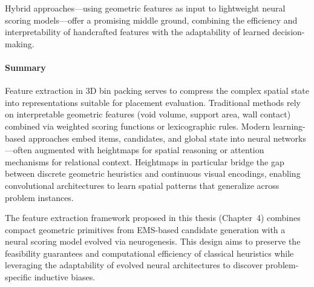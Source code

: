 Hybrid approaches---using geometric features as input to lightweight neural scoring models---offer a promising middle ground, combining the efficiency and interpretability of handcrafted features with the adaptability of learned decision-making.


\paragraph{Summary}

Feature extraction in 3D bin packing serves to compress the complex spatial state into representations suitable for placement evaluation. Traditional methods rely on interpretable geometric features (void volume, support area, wall contact) combined via weighted scoring functions or lexicographic rules. Modern learning-based approaches embed items, candidates, and global state into neural networks---often augmented with heightmaps for spatial reasoning or attention mechanisms for relational context. Heightmaps in particular bridge the gap between discrete geometric heuristics and continuous visual encodings, enabling convolutional architectures to learn spatial patterns that generalize across problem instances.

The feature extraction framework proposed in this thesis (Chapter~4) combines compact geometric primitives from EMS-based candidate generation with a neural scoring model evolved via neurogenesis. This design aims to preserve the feasibility guarantees and computational efficiency of classical heuristics while leveraging the adaptability of evolved neural architectures to discover problem-specific inductive biases.
